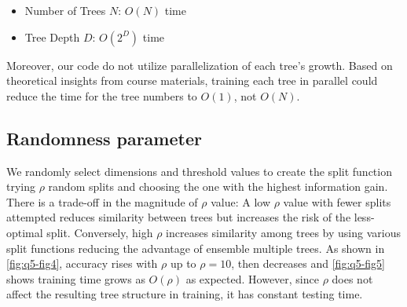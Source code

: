 \begin{itemize}
	\item Number of Trees $N$: $O(N)$ time
	\item Tree Depth $D$: $O(2^D)$ time
\end{itemize}
Moreover, our code do not utilize parallelization of each tree's growth. Based on theoretical insights from course materials, training each tree in parallel could reduce the time for the tree numbers to $O(1)$, not $O(N)$.

\subsection{Randomness parameter}
We randomly select dimensions and threshold values to create the split function trying $\rho$ random splits and choosing the one with the highest information gain. There is a trade-off in the magnitude of $\rho$ value: A low $\rho$ value with fewer splits attempted reduces similarity between trees but increases the risk of the less-optimal split. Conversely, high $\rho$ increases similarity among trees by using various split functions reducing the advantage of ensemble multiple trees. As shown in \cref{fig:q5-fig4}, accuracy rises with $\rho$ up to $\rho=10$, then decreases and \cref{fig:q5-fig5} shows training time grows as $O(\rho)$ as expected. However, since $\rho$ does not affect the resulting tree structure in training, it has constant testing time.

